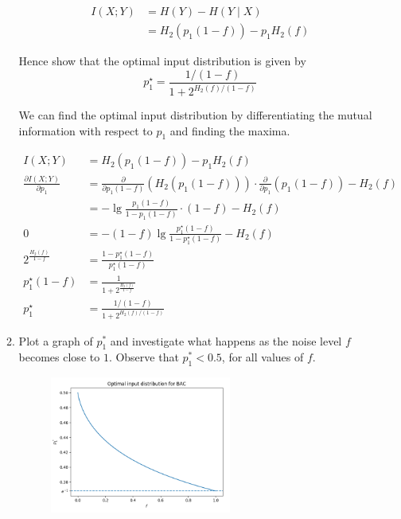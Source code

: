 \documentclass[10pt,\jkfside,a4paper]{article}
\begin{document}
\begin{enumerate}
\begin{enumerate}
        \begin{align*}
            I(X; Y)
            &= H(Y) - H(Y \mid X) \\
            &= H_2(p_1 (1 - f)) - p_1 H_2(f)
        \end{align*}

        Hence show that the optimal input distribution is given by
        \[
            p_1^\star = \frac{1/(1 - f)}{1 + 2^{H_2(f)/(1 - f)}}
        \]

        We can find the optimal input distribution by differentiating the mutual information with respect to $p_1$ and finding the maxima.

        \begin{align*}
            I(X; Y)
            &= H_2(p_1 (1 - f)) - p_1 H_2(f) \\
            \frac{\partial I(X; Y)}{\partial p_1}
            &= \frac{\partial}{\partial p_1 (1 - f)}(H_2(p_1 (1 - f))) \cdot \frac{\partial}{\partial p_1}(p_1 (1 - f)) - H_2(f) \\
            &= - \lg \frac{p_1(1 - f)}{1 - p_1(1 - f)} \cdot (1 - f) - H_2(f) \\
            0 &= - (1 - f) \lg \frac{p_1^\star(1 - f)}{1 - p_1^\star(1 - f)} - H_2(f) \\
            2^{\frac{H_2(f)}{1 - f}} &= \frac{1 - p_1^\star(1 - f)}{p_1^\star(1 - f)} \\
            p_1^\star(1 - f) &= \frac{1}{1 + 2^{\frac{H_2(f)}{1 - f}}} \\
            p_1^\star &= \frac{1/(1 - f)}{1 + 2^{H_2(f)/(1 - f)}}
        \end{align*}

        \item Plot a graph of $p_1^*$ and investigate what happens as the noise level $f$ becomes close to $1$. Observe that $p_1^* < 0.5$, for all values of $f$.

        \begin{figure}[H]

            \centering

            \includegraphics[width=0.6\textwidth]{bac-plot}


\end{figure}
\end{enumerate}
\end{enumerate}
\end{document}
